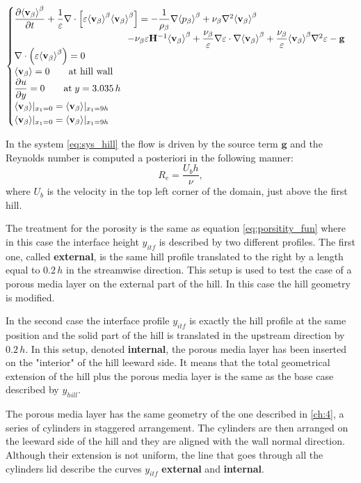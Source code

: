 \begin{eqnarray}
\begin{cases}
\dfrac{\partial {\left< \textbf{v}_{\beta} \right>}^{\beta}}{\partial t} + \dfrac{1}{\varepsilon} \nabla \cdot \left[ \varepsilon {\left< \textbf{v}_{\beta} \right>}^{\beta}  {\left< \textbf{v}_{\beta} \right>}^{\beta} \right] = -\dfrac{1}{\rho_{\beta}} \nabla {\left< p_{\beta}\right>}^{\beta} + \nu_{\beta} \nabla^2 {\left< \textbf{v}_{\beta} \right>}^{\beta} \\ 
\qquad \qquad \qquad \qquad \qquad \qquad- \nu_{\beta} \varepsilon \mathbf{H}^{-1} {\left< \textbf{v}_{\beta} \right>}^{\beta} +\dfrac{\nu_{\beta}}{\varepsilon} \nabla \varepsilon \cdot \nabla {\left< \textbf{v}_{\beta} \right>}^{\beta} + \dfrac{\nu_{\beta}}{\varepsilon} {\left< \textbf{v}_{\beta} \right>}^{\beta} \nabla^2 \varepsilon - \mathbf{g}\\
\nabla \cdot \left(\varepsilon {\left< \textbf{v}_{\beta} \right>}^{\beta} \right) = 0\\
{\left< \textbf{v}_{\beta} \right>} = 0 \qquad \textrm{at hill wall} \\
\dfrac{\partial u}{\partial y}=0 \qquad \textrm{at} \; y = 3.035\,h\\
{\left< \textbf{v}_{\beta} \right>}|_{x_1 = 0} = {\left< \textbf{v}_{\beta} \right>}|_{x_1 = 9h} \\
{\left< \textbf{v}_{\beta} \right>}|_{x_1 = 0} = {\left< \textbf{v}_{\beta} \right>}|_{x_1 = 9h} 
\end{cases}
\label{eq:sys_hill}
\end{eqnarray}

In the system \eqref{eq:sys_hill} the flow is driven by the source term $\mathbf{g}$ and the Reynolds number is computed a posteriori in the following manner:
$$
R_e = \dfrac{U_b h}{\nu},
$$
where $U_b$ is the velocity in the top left corner of the domain, just above the first hill.

The treatment for the porosity is the same as equation \eqref{eq:porsitity_fun} where in this case the interface height $y_{itf}$ is described by two different profiles.
The first one, called \textbf{external}, is the same hill profile translated to the right by a length equal to $0.2\,h$ in the streamwise direction. This setup is used to test the case of a porous media layer on the external part of the hill. In this case the hill geometry is modified.

In the second case the interface profile $y_{itf}$ is exactly the hill profile at the same position and the solid part of the hill is translated in the upstream direction by $0.2\,h$. In this setup, denoted \textbf{internal}, the porous media layer has been inserted on the "interior" of the hill leeward side. It means that the total geometrical extension of the hill plus the porous media layer is the same as the base case described by $y_{hill}$.

The porous media layer has the same geometry of the one described in \ref{ch:4}, a series of cylinders in staggered arrangement. The cylinders are then arranged on the leeward side of the hill and they are aligned with the wall normal direction. Although their extension is not uniform, the line that goes through all the cylinders lid describe the curves $y_{itf}$ \textbf{external} and \textbf{internal}.

